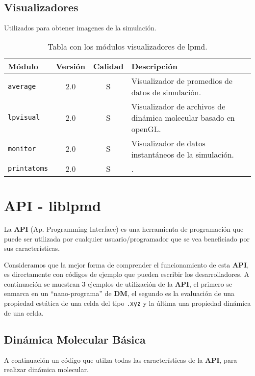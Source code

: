 \section{Visualizadores}
Utilizados para obtener imagenes de la simulaci\'on.

\begin{table}[h!]
 \begin{tabular}{|l|c|c|p{10cm}|}\hline
 M\'odulo & Versi\'on & Calidad & Descripci\'on \\
 \hline\hline
 \texttt{average} & 2.0 & S & Visualizador de promedios de datos de simulaci\'on.\\
 \hline
 \texttt{lpvisual} & 2.0 & S & Visualizador de archivos de din\'amica molecular basado en openGL.\\
 \hline
 \texttt{monitor} & 2.0 & S & Visualizador de datos instant\'aneos de la simulaci\'on.\\
 \hline
 \texttt{printatoms} & 2.0 & S & .\\
 \hline
 \end{tabular}
\label{tab:modgvisual}
\caption{Tabla con los m\'odulos visualizadores de lpmd.}
\end{table}



\chapter{API - liblpmd}
\label{ap:API}
La \textbf{API} (Ap. Programming Interface) es una herramienta de programaci\'on que puede ser utilizada por cualquier usuario/programador que se vea beneficiado por sus caracter\'isticas.

Consideramos que la mejor forma de comprender el funcionamiento de esta \textbf{API}, es directamente con c\'odigos de ejemplo que pueden escribir los desarrolladores. A continuaci\'on se muestran 3 ejemplos de utilizaci\'on de la \textbf{API}, el primero se enmarca en un ``nano-programa'' de \textbf{DM}, el segundo es la evaluaci\'on de una propiedad est\'atica de una celda del tipo \texttt{.xyz} y la \'ultima una propiedad din\'amica de una celda.

\section{Din\'amica Molecular B\'asica}

A continuaci\'on un c\'odigo que utilza todas las caracter\'isticas de la \textbf{API}, para realizar din\'amica molecular.

